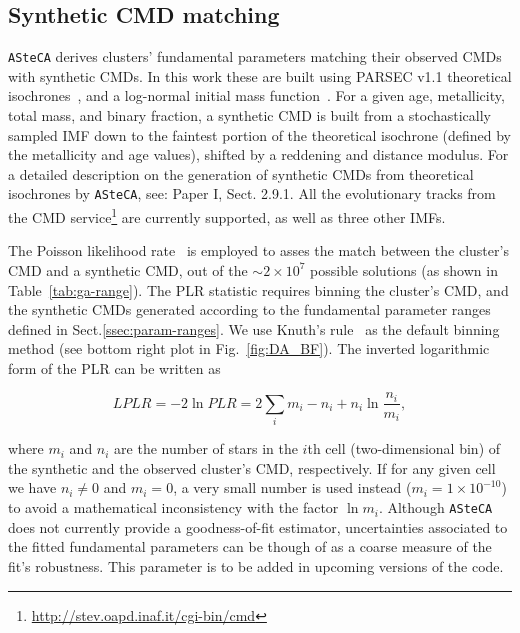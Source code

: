 \documentclass[draft]{aa}
\begin{document}
\subsection{Synthetic CMD matching}
\label{ssec:synth-match}

\texttt{ASteCA} derives clusters' fundamental parameters matching their observed
CMDs with synthetic CMDs. In this work these are built using PARSEC v1.1
theoretical isochrones~\citep[][B12]{Bressan_2012},
and a log-normal initial mass function~\citep[IMF,][]{Chabrier_2001}.
%
For a given age, metallicity, total mass, and binary fraction, a
synthetic CMD is built from a stochastically sampled IMF down to the
faintest portion of the theoretical isochrone (defined by the metallicity and
age values), shifted by a reddening and distance modulus. For a detailed
description on the generation of synthetic CMDs from theoretical
isochrones by \texttt{ASteCA}, see: Paper I, Sect. 2.9.1. All the evolutionary
tracks from the CMD service\footnote{\url{http://stev.oapd.inaf.it/cgi-bin/cmd}}
are currently supported, as well as three other IMFs.

The Poisson likelihood rate~\citep[PLR,][]{Dolphin_2002} is employed
to asses the match between the cluster's CMD and a synthetic
CMD, out of the ${\sim}2{\times}10^7$ possible solutions (as shown in
Table~\ref{tab:ga-range}).
The PLR statistic requires binning the cluster's CMD, and the synthetic CMDs
generated according to the fundamental parameter ranges defined in
Sect.\ref{ssec:param-ranges}.
We use Knuth's rule~\citep[][also implemented via the astroML package]
{Knuth_2006} as the default binning method (see bottom right plot in
Fig.~\ref{fig:DA_BF}).
The inverted logarithmic form of the PLR can be written as

\begin{equation}
LPLR  = -2 \ln PLR = 2 \sum_i m_i - n_i + n_i \ln \frac{n_i}{m_i},
\label{eq:likelihood}
\end{equation}

\noindent where $m_i$ and $n_i$ are the number of stars in the $i$th cell
(two-dimensional bin) of the synthetic and the observed cluster's CMD,
respectively. If for any given cell we have $n_i\neq0$ and $m_i=0$, a
very small number is used instead ($m_i=1{\times}10^{-10}$) to avoid a
mathematical inconsistency with the factor $\ln m_i$.
Although \texttt{ASteCA} does not currently provide a goodness-of-fit
estimator, uncertainties associated to the fitted fundamental parameters
can be though of as a coarse measure of the fit's robustness. This parameter is
to be added in upcoming versions of the code.
\end{document}
